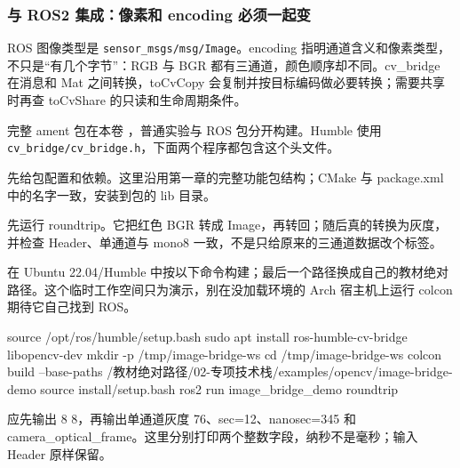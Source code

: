 \subsubsection{与 ROS2 集成：像素和 encoding 必须一起变}
ROS 图像类型是 \texttt{sensor\_msgs/msg/Image}。encoding 指明通道含义和像素类型，不只是“有几个字节”：RGB 与 BGR 都有三通道，颜色顺序却不同。cv\_bridge 在消息和 Mat 之间转换，toCvCopy 会复制并按目标编码做必要转换；需要共享时再查 toCvShare 的只读和生命周期条件。

完整 ament 包在本卷 ，普通实验与 ROS 包分开构建。Humble 使用 \texttt{cv\_bridge/cv\_bridge.h}，下面两个程序都包含这个头文件。
\begin{example}
先给包配置和依赖。这里沿用第一章的完整功能包结构；CMake 与 package.xml 中的名字一致，安装到包的 lib 目录。
\begin{cvblock}

\end{cvblock}
\begin{cvblock}

\end{cvblock}
先运行 roundtrip。它把红色 BGR 转成 Image，再转回；随后真的转换为灰度，并检查 Header、单通道与 mono8 一致，不是只给原来的三通道数据改个标签。
\begin{cvblock}

\end{cvblock}
在 Ubuntu 22.04/Humble 中按以下命令构建；最后一个路径换成自己的教材绝对路径。这个临时工作空间只为演示，别在没加载环境的 Arch 宿主机上运行 colcon 期待它自己找到 ROS。
\begin{cvblock}
\begin{tbash}
source /opt/ros/humble/setup.bash
sudo apt install ros-humble-cv-bridge libopencv-dev
mkdir -p /tmp/image-bridge-ws
cd /tmp/image-bridge-ws
colcon build --base-paths /教材绝对路径/02-专项技术栈/examples/opencv/image-bridge-demo
source install/setup.bash
ros2 run image_bridge_demo roundtrip
\end{tbash}
\end{cvblock}
应先输出 8 8，再输出单通道灰度 76、sec=12、nanosec=345 和 camera\_optical\_frame。这里分别打印两个整数字段，纳秒不是毫秒；输入 Header 原样保留。


\end{example}
